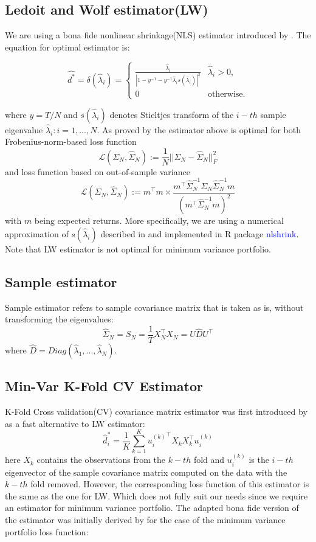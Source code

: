 \documentclass{article}
\begin{document}
\subsection{Ledoit and Wolf estimator(LW)}

We are using a bona fide nonlinear shrinkage(NLS) estimator introduced by . The equation for optimal estimator is: 

$$
	\hat{d^*} = \delta(\hat{\lambda}_i) = 
		\begin{cases}
			\frac{\hat{\lambda}_i}{|1 - y^{-1} - y^{-1}\hat{\lambda}_i s(\hat{\lambda}_i)|^2} & \hat{\lambda}_i > 0,\\
			0 & \text{otherwise.}
		\end{cases}
$$ 

where $y = T/N$ and $s(\hat{\lambda}_i)$ denotes Stieltjes transform of the $i-th$ sample eigenvalue $\hat{\lambda}_i : i=1,...,N $. As proved by  the estimator above is optimal for both Frobenius-norm-based loss function 
$$
\mathcal{L}(\Sigma_N,\hat{\Sigma}_N):= \dfrac{1}{N}||\Sigma_N-\hat{\Sigma}_N||_F^2
$$ and loss function based on out-of-sample variance
$$
\mathcal{L}(\Sigma_N,\hat{\Sigma}_N):= m^\intercal m \times \dfrac{m^\intercal \hat{\Sigma}_N ^{-1} \Sigma_N \hat{\Sigma}_N ^{-1} m }{( m^\intercal \hat{\Sigma}_N ^{-1} m )^2 }
$$
with $m$ being expected returns. More specifically, we are using a numerical approximation of $s(\hat{\lambda}_i)$ described in  and implemented in R package \textcolor{blue}{nlshrink}. Note that LW estimator is not optimal for minimum variance portfolio.

\subsection{Sample estimator}

Sample estimator refers to sample covariance matrix that is taken as is, without transforming the eigenvalues:
$$ \hat{\Sigma}_N = S_N = \dfrac{1}{T} X^\intercal_N X_N = U\hat{D}U^\intercal $$
where $\hat{D} = Diag(\hat{\lambda}_1,...,\hat{\lambda}_N)$.

\subsection{Min-Var K-Fold CV Estimator}

K-Fold Cross validation(CV) covariance matrix estimator was first introduced by  as a fast alternative to LW estimator: 
$$\hat{d}^*_i = \dfrac{1}{K} \sum_{k=1}^K {u_i^{(k)}}^\intercal X_k X_k^\intercal u_i^{(k)} $$
here $X_k$ contains the observations from the $k-th$ fold and $u_i^{(k)}$ is the $i-th$ eigenvector of the sample covariance matrix computed on the data with the $k-th$ fold removed. However, the corresponding loss function of this estimator is the same as the one for LW. Which does not fully suit our needs since we require an estimator for minimum variance portfolio. The adapted bona fide version of the estimator was initially derived by  for the case of the minimum variance portfolio loss function:
\end{document}
